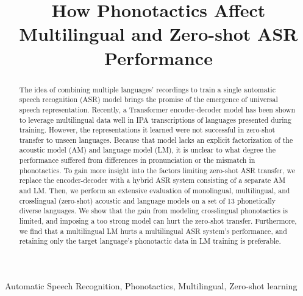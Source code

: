 \documentclass{article}
\title{How Phonotactics Affect Multilingual and Zero-shot ASR Performance}
\begin{document}
\ninept
%
\maketitle
%
\begin{abstract}
The idea of combining multiple languages' recordings to train a single automatic speech recognition (ASR) model brings the promise of the emergence of universal speech representation.
Recently, a Transformer encoder-decoder model has been shown to leverage multilingual data well in IPA transcriptions of languages presented during training.
However, the representations it learned were not successful in zero-shot transfer to unseen languages.
Because that model lacks an explicit factorization of the acoustic model (AM) and language model (LM), it is unclear to what degree the performance suffered from differences in pronunciation or the mismatch in phonotactics.
To gain more insight into the factors limiting zero-shot ASR transfer, we replace the encoder-decoder with a hybrid ASR system consisting of a separate AM and LM.
Then, we perform an extensive evaluation of monolingual, multilingual, and crosslingual (zero-shot) acoustic and language models on a set of 13 phonetically diverse languages.
We show that the gain from modeling crosslingual phonotactics is limited, and imposing a too strong model can hurt the zero-shot transfer.
Furthermore, we find that a multilingual LM hurts a multilingual ASR system's performance, and retaining only the target language's phonotactic data in LM training is preferable.
\end{abstract}

\begin{keywords}
Automatic Speech Recognition, Phonotactics, Multilingual, Zero-shot learning
\end{keywords}
%

\end{document}
